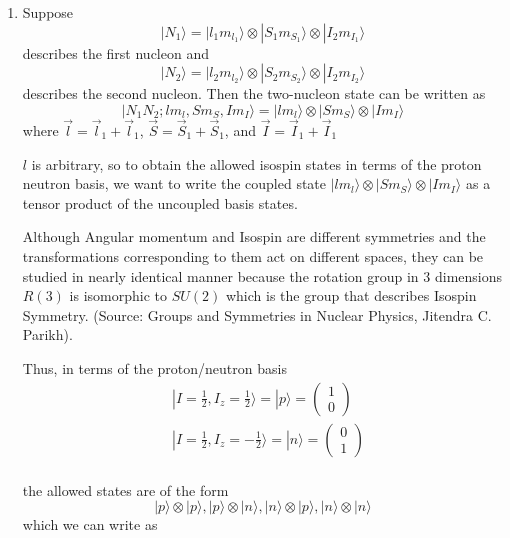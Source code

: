 \documentclass{article}
\newcommand{\ket}[1]{|#1 \rangle}
\begin{document}
\begin{enumerate}[label=(\alph*)]
  \item Suppose 
  \[ \ket{N_1} = \ket{l_1 m_{l_1}} \otimes \ket{S_1 m_{S_1}} \otimes \ket{I_2 m_{I_1}} \]
  describes the first nucleon and 
  \[ \ket{N_2} = \ket{l_2 m_{l_2}} \otimes \ket{S_2 m_{S_2}} \otimes \ket{I_2 m_{I_2}} \] describes the second nucleon. Then the two-nucleon state can be written as \[  \ket{N_1 N_2;l m_l, S m_S, I m_I} = \ket{l m_l} \otimes \ket{S m_S} \otimes \ket{I m_I}  \] where $\vec{l} = \vec{l}_1 + \vec{l}_1$, $\vec{S} = \vec{S}_1 + \vec{S}_1$, and $\vec{I} = \vec{I}_1 + \vec{I}_1$

  \vskip 0.25cm
  $l$ is arbitrary, so to obtain the allowed isospin states in terms of the proton neutron basis, we want to write the coupled state $\ket{l m_l} \otimes \ket{S m_S} \otimes \ket{I m_I}$ as a tensor product of the uncoupled basis states.

  \vskip 0.25cm
  Although Angular momentum and Isospin are different symmetries and the transformations corresponding to them act on different spaces, they can be studied in nearly identical manner because the rotation group in 3 dimensions $R(3)$ is isomorphic to $SU(2)$ which is the group that describes Isospin Symmetry. (Source: Groups and Symmetries in Nuclear Physics, Jitendra C. Parikh).

  \vskip 0.25cm
  Thus, in terms of the proton/neutron basis 
  \begin{align*}
    &\ket{I = \frac{1}{2}, I_z = \frac{1}{2}} = \ket{p} = \begin{pmatrix}
      1 \\ 0
    \end{pmatrix} \\
    &\ket{I = \frac{1}{2}, I_z = -\frac{1}{2}} = \ket{n} = \begin{pmatrix}
      0 \\ 1
    \end{pmatrix}\\
  \end{align*}

  the allowed states are of the form
  \[ \ket{p} \otimes \ket{p}, \ket{p} \otimes \ket{n}, \ket{n} \otimes \ket{p}, \ket{n} \otimes \ket{n} \]
  which we can write as 



\end{enumerate}
\end{document}
